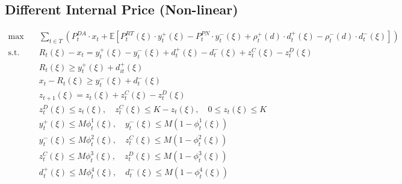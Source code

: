 \documentclass[10pt]{article}
\begin{document}
\subsection{Different Internal Price (Non-linear)}
\begin{subequations}
    \begin{align}
        \text{max} \quad &\sum_{t\in T}\left(P_t^{DA} \cdot x_{t} + \mathbb{E}\left[P_t^{RT}(\xi) \cdot y^+_{t}(\xi) - P_t^{PN} \cdot y^-_{t}(\xi) + \rho^+_t(d) \cdot d^+_{t}(\xi) - \rho^-_t(d) \cdot d^-_{t}(\xi)\right]\right)&\\   
        \text{s.t.} \quad &R_{t}(\xi) - x_{t} = y_{t}^{+}(\xi) - y_{t}^{-}(\xi) + d^+_{t}(\xi) - d^-_{t}(\xi) + z^C_{t}(\xi) - z^D_{t}(\xi) &\\
        & R_{t}(\xi) \geq y^+_t(\xi) + d^+_{it}(\xi)&\\
        & x_{t} - R_{t}(\xi) \geq y^-_{t}(\xi) + d^-_{t}(\xi)&\\
        &z_{t+1}(\xi) = z_{t}(\xi) + z^C_{t}(\xi) - z^D_{t}(\xi)&\\
        &z^D_{t}(\xi) \le z_{t}(\xi), \quad z^C_{t}(\xi) \le K - z_{t}(\xi), \quad 0 \leq z_{t}(\xi) \leq K &\\
        &y^+_{t}(\xi) \leq M \phi^1_{t}(\xi), \quad y^-_{t}(\xi) \leq M (1 - \phi^1_{t}(\xi)) &\\
        &y^-_{t}(\xi) \leq M \phi^2_{t}(\xi), \quad z^C_{t}(\xi) \leq M (1 - \phi^2_{t}(\xi)) &\\
        &z^C_{t}(\xi) \leq M \phi^3_{t}(\xi), \quad z^D_{t}(\xi) \leq M (1 - \phi^3_{t}(\xi)) &\\
        &d^+_{t}(\xi) \leq M \phi^4_{t}(\xi), \quad d^-_{t}(\xi) \leq M (1 - \phi^4_{t}(\xi))&
    \end{align}
\end{subequations}
\end{document}
